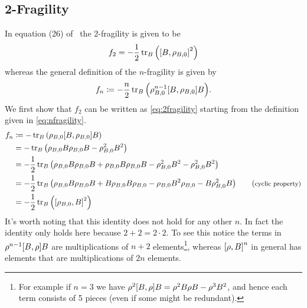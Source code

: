 \documentclass[11pt,english]{article}
\theoremstyle{definition}
\begin{document}
\subsection{2-Fragility}
In equation (26) of~\cite{dynamic-entropies} the 2-fragility is given to be
\begin{equation}\label{eq:2fragility}
	f_2 = -\frac{1}{2}\tr_B\qty(\comm{B}{\rho_{B, 0}}^2)
\end{equation}
whereas the general definition of the $n$-fragility is given by
\begin{equation}\label{eq:nfragility}
	f_n\coloneqq -\frac{n}{2}\tr_B\qty(\rho_{B, 0}^{n-1}\comm{B}{\rho_{B, 0}}B).
\end{equation}
We first show that $f_2$ can be written as \cref{eq:2fragility} starting from the definition given in \cref{eq:nfragility}.
\begin{align*}
	f_n & \coloneqq -\tr_B\qty(\rho_{B, 0}\comm{B}{\rho_{B, 0}}B)                                                                                                         \\
	    & = -\tr_B\qty(\rho_{B, 0}B\rho_{B, 0}B - \rho_{B, 0}^2B^2)                                                                                                       \\
	    & = -\frac{1}{2}\tr_B\qty(\rho_{B, 0}B\rho_{B, 0}B + \rho_{B, 0}B\rho_{B, 0}B - \rho_{B, 0}^2B^2 - \rho_{B, 0}^2B^2)                                              \\
	    & = -\frac{1}{2}\tr_B\qty(\rho_{B, 0}B\rho_{B, 0}B + B\rho_{B, 0}B\rho_{B, 0} - \rho_{B, 0}B^2\rho_{B, 0} - B\rho_{B, 0}^2B) \tag{\footnotesize{cyclic property}} \\
	    & = -\frac{1}{2}\tr_B\qty(\comm{\rho_{B, 0}}{B}^2)
\end{align*}
It's worth noting that this identity does not hold for any other $n$. In fact the identity only holds here because $2+2 = 2\cdot 2$. To see this notice the terms in $\rho^{n-1}\comm{B}{\rho}B$ are multiplications of $n+2$ elements\footnote{For example if $n = 3$ we have $\rho^{2}\comm{B}{\rho}B = \rho^2B\rho B - \rho^3B^2$, and hence each term consists of 5 pieces (even if some might be redundant).}, whereas $\comm{\rho}{B}^n$ in general has elements that are multiplications of $2n$ elements.
\end{document}
